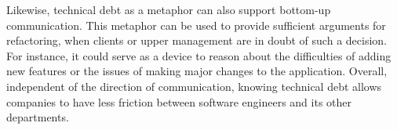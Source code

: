 Likewise, technical debt as a metaphor 
	can also support bottom-up communication.
This metaphor can be used to provide sufficient arguments for refactoring, 
	when clients or upper management are in doubt of such a decision.
For instance, it could serve as a device to reason about 
	the difficulties of adding new features or 
	the issues of making major changes to the application. 
Overall, independent of the direction of communication, knowing technical debt allows companies to have less friction between
	software engineers and its other departments. 